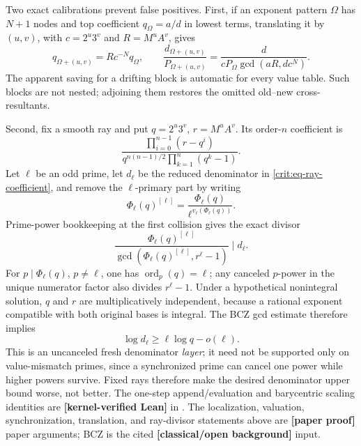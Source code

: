 \documentclass[11pt,oneside]{article}
\theoremstyle{definition}
\theoremstyle{remark}
\newcommand{\lean}[1]{\texttt{\detokenize{#1}}}
\newcommand{\statuslean}{\textcolor{leanblue}{\textbf{[kernel-verified Lean]}}}
\newcommand{\statusnew}{\textcolor{newgreen}{\textbf{[paper proof]}}}
\newcommand{\statusknown}{\textcolor{classicalgray}{\textbf{[classical/open background]}}}
\begin{document}
Two exact calibrations prevent false positives.  First, if an exponent pattern $\Omega$ has
$N+1$ nodes and top coefficient $q_\Omega=a/d$ in lowest terms, translating it by $(u,v)$,
with $c=2^u3^v$ and $R=M^uA^v$, gives
\begin{equation}
 q_{\Omega+(u,v)}=Rc^{-N}q_\Omega,\qquad
 \frac{d_{\Omega+(u,v)}}{P_{\Omega+(u,v)}}
 =\frac{d}{cP_\Omega\gcd(aR,dc^N)}.
 \label{crit:eq-translated-block}
\end{equation}
The apparent saving for a drifting block is automatic for every value table.  Such blocks
are not nested; adjoining them restores the omitted old--new cross-resultants.

Second, fix a smooth ray and put $q=2^u3^v$, $r=M^uA^v$.  Its order-$n$ coefficient is
\begin{equation}
 \frac{\prod_{i=0}^{n-1}(r-q^i)}
 {q^{n(n-1)/2}\prod_{k=1}^n(q^k-1)}.
 \label{crit:eq-ray-coefficient}
\end{equation}
Let $\ell$ be an odd prime, let $d_\ell$ be the reduced denominator in
\eqref{crit:eq-ray-coefficient}, and remove the $\ell$-primary part by writing
\[
 \Phi_\ell(q)^{[\ell]}=
 \frac{\Phi_\ell(q)}{\ell^{v_\ell(\Phi_\ell(q))}}.
\]
Prime-power bookkeeping at the first collision gives the exact divisor
\begin{equation}
 \frac{\Phi_\ell(q)^{[\ell]}}
 {\gcd(\Phi_\ell(q)^{[\ell]},r^\ell-1)}\mid d_\ell.
 \label{crit:eq-ray-fresh-divisor}
\end{equation}
For $p\mid\Phi_\ell(q)$, $p\ne\ell$, one has $\operatorname{ord}_p(q)=\ell$; any canceled
$p$-power in the unique numerator factor also divides $r^\ell-1$.  Under a hypothetical
nonintegral solution, $q$ and $r$ are multiplicatively independent, because a rational
exponent compatible with both original bases is integral.  The BCZ gcd estimate therefore
implies
\begin{equation}
 \log d_\ell\ge \ell\log q-o(\ell).
 \label{crit:eq-ray-bcz-lower}
\end{equation}
This is an uncanceled fresh denominator \emph{layer}; it need not be supported only on
value-mismatch primes, since a synchronized prime can cancel one power while higher powers
survive.  Fixed rays therefore make the desired denominator upper bound worse, not better.
The one-step append/evaluation and barycentric scaling identities are \statuslean{} in
\lean{NewtonCollisionCore}.  The localization, valuation, synchronization, translation,
and ray-divisor statements above are \statusnew{} paper arguments; BCZ is the cited
\statusknown{} input.
\end{document}
